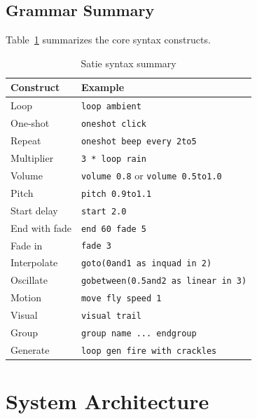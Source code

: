 \documentclass[sigconf,anonymous,review]{nimeart}
\begin{document}
\subsection{Grammar Summary}

Table~\ref{tab:syntax} summarizes the core syntax constructs.

\begin{table}[htbp]
\caption{Satie syntax summary}
\label{tab:syntax}
\begin{tabular}{ll}
\toprule
\textbf{Construct} & \textbf{Example} \\
\midrule
Loop & \texttt{loop ambient} \\
One-shot & \texttt{oneshot click} \\
Repeat & \texttt{oneshot beep every 2to5} \\
Multiplier & \texttt{3 * loop rain} \\
Volume & \texttt{volume 0.8} or \texttt{volume 0.5to1.0} \\
Pitch & \texttt{pitch 0.9to1.1} \\
Start delay & \texttt{start 2.0} \\
End with fade & \texttt{end 60 fade 5} \\
Fade in & \texttt{fade 3} \\
Interpolate & \texttt{goto(0and1 as inquad in 2)} \\
Oscillate & \texttt{gobetween(0.5and2 as linear in 3)} \\
Motion & \texttt{move fly speed 1} \\
Visual & \texttt{visual trail} \\
Group & \texttt{group name ... endgroup} \\
Generate & \texttt{loop gen fire with crackles} \\
\bottomrule
\end{tabular}
\end{table}


\section{System Architecture}
\end{document}
